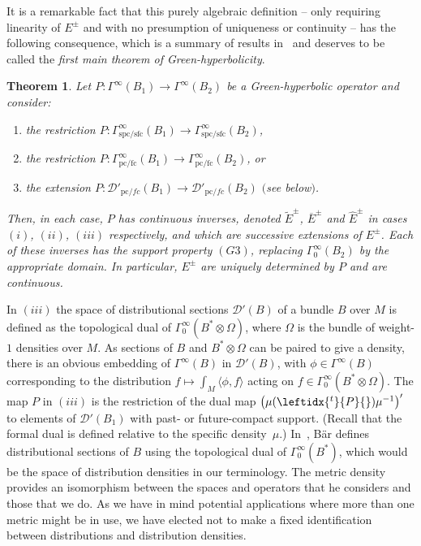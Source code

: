 \documentclass[11pt]{article}
\numberwithin{equation}{section}
\numberwithin{equation}{section}
\newtheorem{Theorem}{Theorem}[section]
\newcommand{\fc}{\mathrm{fc}}
\newcommand{\pc}{\mathrm{pc}}
\newcommand{\sfc}{\mathrm{sfc}}
\newcommand{\spc}{\mathrm{spc}}
\newcommand{\DD}{{\mathscr D}}
\newcommand{\adj}[1]{\leftidx{^{t}}{#1}{}}
\renewcommand{\theenumi}{(\alph{enumi})}
\begin{document}
 It is a remarkable fact that this purely algebraic definition -- only requiring linearity of $E^\pm$ and with no presumption of uniqueness or continuity -- has the following consequence, which is a summary of results in~\cite[Sections 3 and 4]{Baer:2015} and deserves to be called the \emph{first main theorem of Green-hyperbolicity}.
 \begin{Theorem}\label{thm:GHbasics}
 	Let $P\colon\Gamma^\infty(B_1)\to \Gamma^\infty(B_2)$ be a Green-hyperbolic operator and consider:
 	\begin{enumerate}\renewcommand{\theenumi}{(\roman{enumi})}\itemsep=0pt
 		\item[$(i)$] the restriction $P\colon\Gamma^\infty_{\spc/\sfc}(B_1)\to\Gamma^\infty_{\spc/\sfc}(B_2)$,
 		\item[$(ii)$] the restriction $P\colon\Gamma^\infty_{\pc/\fc}(B_1)\to\Gamma^\infty_{\pc/\fc}(B_2)$, or
 		\item[$(iii)$] the extension $P\colon\DD'_{\pc/fc}(B_1)\to\DD'_{\pc/fc}(B_2)$ $($see below$)$.
 	\end{enumerate}
 	Then, in each case, $P$ has continuous inverses, denoted
 	$\tilde{E}^\pm$, $\overline{E}^\pm$ and $\widehat{E}^\pm$ in cases
 	$(i)$, $(ii)$, $(iii)$ respectively, and which are successive extensions of $E^\pm$. Each of these inverses has the support property $(G3)$, replacing
 	$\Gamma_0^\infty(B_2)$ by the appropriate domain. In particular,
 	$E^\pm$ are uniquely determined by $P$ and are continuous.
 \end{Theorem}	
 In $(iii)$ the space of distributional sections $\DD'(B)$ of a bundle $B$ over $M$ is defined
 as the topological dual of $\Gamma_0^\infty(B^*\otimes\Omega)$, where $\Omega$ is the bundle of weight-$1$ densities over $M$. As sections of $B$ and $B^*\otimes\Omega$ can be paired to give a density, there is an obvious embedding of $\Gamma^\infty(B)$ in $\DD'(B)$, with $\phi\in\Gamma^\infty(B)$ corresponding to the distribution
 $f\mapsto \int_M \langle \phi,f\rangle$ acting on $f\in \Gamma_0^\infty(B^*\otimes\Omega)$.
 The map $P$ in $(iii)$ is the restriction of the dual map
 $\big(\mu(\adj{P})\mu^{-1}\big)'$ to elements of $\DD'(B_1)$ with past- or future-compact support.
 (Recall that the formal dual is defined relative to the specific density~$\mu$.)
 In~\cite{Baer:2015}, B\"ar defines distributional sections of $B$ using
 the topological dual of $\Gamma_0^\infty(B^*)$, which would be the space of distribution densities in our terminology. The metric density
 provides an isomorphism between the spaces and operators that he considers and those that we do. As we have in mind potential applications where more than one metric might be in use, we have elected not to make a fixed identification between distributions and distribution densities.
\end{document}
